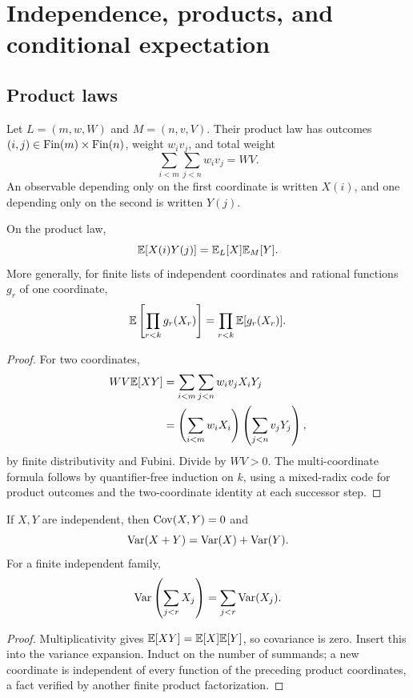 \section{Independence, products, and conditional expectation}\label{sec:independence}

\subsection{Product laws}

\begin{definition}\label{def:product-law}
Let \(L=(m,w,W)\) and \(M=(n,v,V)\).  Their product law has outcomes
\((i,j)\in\operatorname{Fin}(m)\times\operatorname{Fin}(n)\), weight \(w_iv_j\), and total weight
\[
 \sum_{i<m}\sum_{j<n}w_iv_j=WV.
\]
An observable depending only on the first coordinate is written \(X(i)\), and
one depending only on the second is written \(Y(j)\).
\end{definition}

\begin{theorem}\label{thm:ind-product}
On the product law,
\[
 \mathbb E[X(i)Y(j)]=\mathbb E_L[X]\mathbb E_M[Y].
\]
More generally, for finite lists of independent coordinates and rational
functions \(g_r\) of one coordinate,
\[
 \mathbb E\left[\prod_{r<k}g_r(X_r)\right]
 =\prod_{r<k}\mathbb E[g_r(X_r)].
\]
\end{theorem}

\begin{proof}
For two coordinates,
\begin{align*}
 WV\mathbb E[XY]
 &=\sum_{i<m}\sum_{j<n}w_iv_jX_iY_j\\
 &=\left(\sum_{i<m}w_iX_i\right)
   \left(\sum_{j<n}v_jY_j\right),
\end{align*}
by finite distributivity and Fubini.  Divide by \(WV>0\).  The multi-coordinate
formula follows by quantifier-free induction on \(k\), using a mixed-radix code
for product outcomes and the two-coordinate identity at each successor step.
\end{proof}

\begin{corollary}\label{cor:ind-var-sum}
If \(X,Y\) are independent, then \(\operatorname{Cov}(X,Y)=0\) and
\[
 \operatorname{Var}(X+Y)=\operatorname{Var}(X)+\operatorname{Var}(Y).
\]
For a finite independent family,
\[
 \operatorname{Var}\left(\sum_{j<r}X_j\right)=\sum_{j<r}\operatorname{Var}(X_j).
\]
\end{corollary}

\begin{proof}
Multiplicativity gives \(\mathbb E[XY]=\mathbb E[X]\mathbb E[Y]\), so covariance is zero.  Insert
this into the variance expansion.  Induct on the number of summands; a new
coordinate is independent of every function of the preceding product
coordinates, a fact verified by another finite product factorization.
\end{proof}

